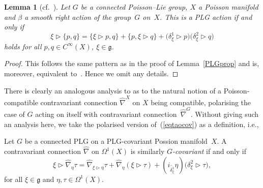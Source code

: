 \documentclass[10pt,a4paper]{amsart}
\numberwithin{equation}{section}
\newtheorem{Lemma}[Theorem]{Lemma}
\newcommand{\<}{{\langle}}
\renewcommand{\>}{{\rangle}}
\newcommand{\la}{{\triangleright}}
\newcommand{\cg}{{\mathfrak{g}}}
\begin{document}
\begin{Lemma}[{cf.~\cite[p.~54]{KS}}]\label{PLGactionprop}
Let $G$ be a connected Poisson--Lie group, $X$ a Poisson manifold and $\beta$ a smooth right action of the group~$G$ on~$X$. This is a PLG action if and only if
 \begin{equation}\label{eqPLGactionprop}
\xi\triangleright\lbrace p,q\rbrace=\lbrace \xi\triangleright p,q\rbrace+\lbrace p,\xi\triangleright q\rbrace+\big(\delta_\xi^1\triangleright p\big)\big(\delta_\xi^2\triangleright q\big)
\end{equation}
holds for all $p,q\in C^\infty(X)$, $\xi\in \cg$. \end{Lemma}
\begin{proof} This follows the same pattern as in the proof of Lemma~\ref{PLGprop} and is, moreover, equivalent to~\cite[p.~54]{KS}. Hence we omit any details.
\end{proof}

There is clearly an analogous analysis to \cite{BegMa:sem} as to the natural notion of a Poisson-compatible contravariant connection $\hat\nabla^X$ on $X$ being compatible, polarising the case of $G$ acting on itself with contravariant connection~$\hat\nabla^G$. Without giving such an analysis here, we take the polarised version of~(\ref{eqtaocov}) as a definition, i.e.,
\begin{Definition}\label{concovX} Let $G$ be a connected PLG on a PLG-covariant Possion manifold~$X$. A contravariant connection $\hat\nabla$ on $\Omega^1(X)$ is similarly {\em $G$-covariant} if and only if
\begin{equation}\label{eq2concovX}
\xi\la\hat{\nabla}_{\eta}\tau=\hat{\nabla}_{\xi\la\eta}\tau+\hat{\nabla}_{\eta}(\xi\la\tau)+(i_{\tilde{\delta_\xi^1}}\eta) \big(\delta_\xi^2\la\tau\big),
\end{equation}
for all $\xi\in \cg$ and $\eta,\tau\in \Omega^1(X)$.
\end{Definition}
\end{document}
